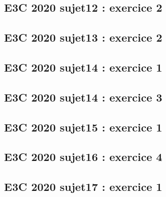 \documentclass[lang=fr,edition=teacher,layout=sheet]{mxbook}
\begin{document}
\begingroup\endgroup
\par\bigskip
{}\subsection*{E3C 2020 sujet12 : exercice 2}
\begingroup\endgroup
\par\bigskip
{}\subsection*{E3C 2020 sujet13 : exercice 2}
\begingroup\endgroup
\par\bigskip
{}\subsection*{E3C 2020 sujet14 : exercice 1}
\begingroup\endgroup
\par\bigskip
{}\subsection*{E3C 2020 sujet14 : exercice 3}
\begingroup\endgroup
\par\bigskip
{}\subsection*{E3C 2020 sujet15 : exercice 1}
\begingroup\endgroup
\par\bigskip
{}\subsection*{E3C 2020 sujet16 : exercice 4}
\begingroup\endgroup
\par\bigskip
{}\subsection*{E3C 2020 sujet17 : exercice 1}
\end{document}
